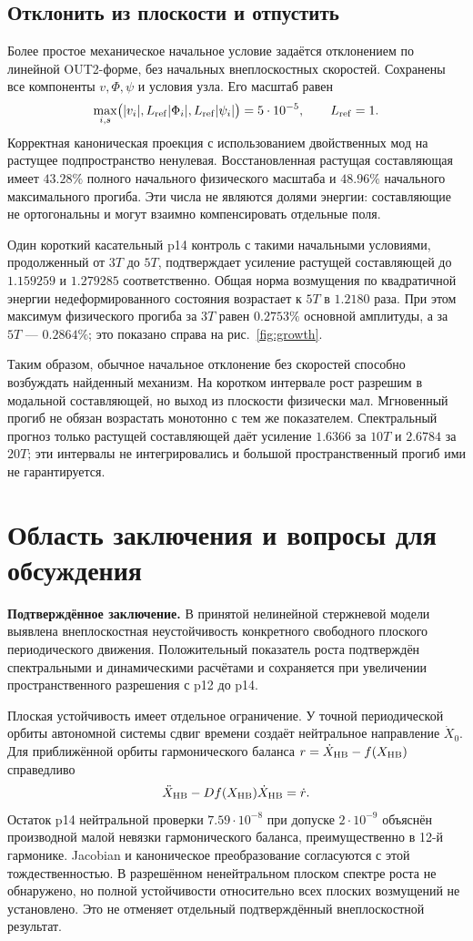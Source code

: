 \documentclass[11pt,a4paper]{article}
\begin{document}
\subsection{Отклонить из плоскости и отпустить}
Более простое механическое начальное условие задаётся отклонением по линейной OUT2-форме, без начальных внеплоскостных скоростей. Сохранены все компоненты $v,\Phi,\psi$ и условия узла. Его масштаб равен
\[
\max_{i,s}\bigl(|v_i|,L_{\rm ref}|\Phi_i|,L_{\rm ref}|\psi_i|\bigr)
=5\cdot10^{-5},\qquad L_{\rm ref}=1.
\]
Корректная каноническая проекция с использованием двойственных мод на растущее подпространство ненулевая. Восстановленная растущая составляющая имеет $43.28\%$ полного начального физического масштаба и $48.96\%$ начального максимального прогиба. Эти числа не являются долями энергии: составляющие не ортогональны и могут взаимно компенсировать отдельные поля.

Один короткий касательный p14 контроль с такими начальными условиями, продолженный от $3T$ до $5T$, подтверждает усиление растущей составляющей до $1.159259$ и $1.279285$ соответственно. Общая норма возмущения по квадратичной энергии недеформированного состояния возрастает к $5T$ в $1.2180$ раза. При этом максимум физического прогиба за $3T$ равен $0.2753\%$ основной амплитуды, а за $5T$ --- $0.2864\%$; это показано справа на рис.~\ref{fig:growth}.

Таким образом, обычное начальное отклонение без скоростей способно возбуждать найденный механизм. На коротком интервале рост разрешим в модальной составляющей, но выход из плоскости физически мал. Мгновенный прогиб не обязан возрастать монотонно с тем же показателем. Спектральный прогноз только растущей составляющей даёт усиление $1.6366$ за $10T$ и $2.6784$ за $20T$; эти интервалы не интегрировались и большой пространственный прогиб ими не гарантируется.

\section{Область заключения и вопросы для обсуждения}
\textbf{Подтверждённое заключение.} В принятой нелинейной стержневой модели выявлена внеплоскостная неустойчивость конкретного свободного плоского периодического движения. Положительный показатель роста подтверждён спектральными и динамическими расчётами и сохраняется при увеличении пространственного разрешения с p12 до p14.

Плоская устойчивость имеет отдельное ограничение. У точной периодической орбиты автономной системы сдвиг времени создаёт нейтральное направление $\dot X_0$. Для приближённой орбиты гармонического баланса $r=\dot X_{\rm HB}-f(X_{\rm HB})$ справедливо
\[
\ddot X_{\rm HB}-Df(X_{\rm HB})\dot X_{\rm HB}=\dot r.
\]
Остаток p14 нейтральной проверки $7.59\cdot10^{-8}$ при допуске $2\cdot10^{-9}$ объяснён производной малой невязки гармонического баланса, преимущественно в 12-й гармонике. Jacobian и каноническое преобразование согласуются с этой тождественностью. В разрешённом ненейтральном плоском спектре роста не обнаружено, но полной устойчивости относительно всех плоских возмущений не установлено. Это не отменяет отдельный подтверждённый внеплоскостной результат.
\end{document}
